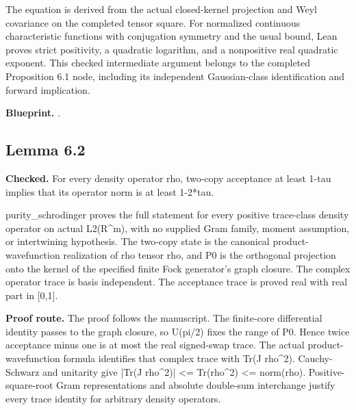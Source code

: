 The equation is derived from the actual closed-kernel projection and Weyl covariance on the completed tensor square. For normalized continuous characteristic functions with conjugation symmetry and the usual bound, Lean proves strict positivity, a quadratic logarithm, and a nonpositive real quadratic exponent. This checked intermediate argument belongs to the completed Proposition 6.1 node, including its independent Gaussian-class identification and forward implication.


\textbf{Blueprint.} .

\subsection{Lemma 6.2}\label{paper:r6-2}
\textbf{Checked.} For every density operator rho, two-copy acceptance at least 1-tau implies that its operator norm is at least 1-2*tau. 

purity\_schrodinger proves the full statement for every positive trace-class density operator on actual L2(R\textasciicircum{}m), with no supplied Gram family, moment assumption, or intertwining hypothesis. The two-copy state is the canonical product-wavefunction realization of rho tensor rho, and P0 is the orthogonal projection onto the kernel of the specified finite Fock generator's graph closure. The complex operator trace is basis independent. The acceptance trace is proved real with real part in [0,1].

\textbf{Proof route.} The proof follows the manuscript. The finite-core differential identity passes to the graph closure, so U(pi/2) fixes the range of P0. Hence twice acceptance minus one is at most the real signed-swap trace. The actual product-wavefunction formula identifies that complex trace with Tr(J rho\textasciicircum{}2). Cauchy-Schwarz and unitarity give |Tr(J rho\textasciicircum{}2)| <= Tr(rho\textasciicircum{}2) <= norm(rho). Positive-square-root Gram representations and absolute double-sum interchange justify every trace identity for arbitrary density operators.


